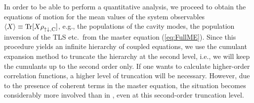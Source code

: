 \documentclass[12pt, a4paper]{iopart}
\newcommand{\avg}[1]{\langle{#1}\rangle}
\begin{document}
In order to be able to perform a quantitative analysis, we proceed to obtain the equations of motion for the mean values of the system observables $\avg{X}\equiv{\rm Tr}[X\rho^{}_{\rm \uparrow\downarrow\:\!,C}]$, e.g., the populations of the cavity modes, the population inversion of the TLS etc.\ from the master equation (\ref{eq:FullME}). Since this procedure yields an infinite hierarchy of coupled equations, we use the cumulant expansion method \cite{JPSJ.17.1100,PRA.82.033810,PRB.89.085308,Foerster_Computer-aided_cluster_expansion} to truncate the hierarchy at the second level, i.e., we will keep the cumulants up to the second order only. If one wants to calculate higher-order correlation functions, a higher level of truncation will be necessary. However, due to the presence of coherent terms in the master equation, the situation becomes considerably more involved than in \cite{Keeling_PRL-nonequilibrium_model_photon-cond,Keeling-Thermalization_photon_condensate}, even at this
second-order truncation level.
\end{document}
